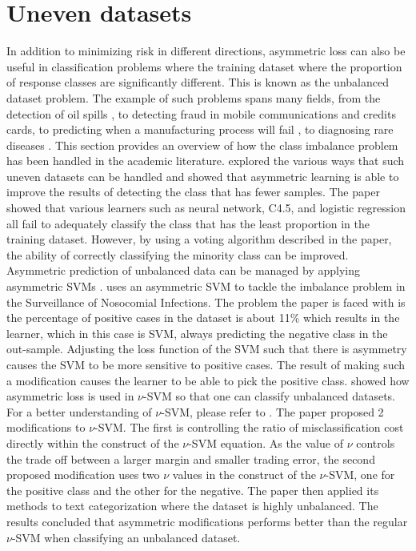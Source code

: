 \section{Uneven datasets}
In addition to minimizing risk in different directions, asymmetric loss can also be useful in classification problems where the training dataset where the proportion of response classes are significantly different. This is known as the unbalanced dataset problem. The example of such problems spans many fields, from the detection of oil spills \citep{Kubat98}, to detecting fraud in mobile communications \citep{Fawcett97} and credits cards, to predicting when a manufacturing process will fail \citep{Riddle94}, to diagnosing rare diseases \citep{Laurikkala01}. This section provides an overview of how the class imbalance problem has been handled in the academic literature. \citet{Daskalaki06} explored the various ways that such uneven datasets can be handled and showed that asymmetric learning is able to improve the results of detecting the class that has fewer samples. The paper showed that various learners such as neural network, C4.5, and logistic regression all fail to adequately classify the class that has the least proportion in the training dataset. However, by using a voting algorithm described in the paper, the ability of correctly classifying the minority class can be improved. Asymmetric prediction of unbalanced data can be managed by applying asymmetric SVMs \citep{Changha05} \citep{Huang05}. \citet{Cohen03} uses an asymmetric SVM to tackle the imbalance problem in the Surveillance of Nosocomial Infections. The problem the paper is faced with is the percentage of positive cases in the dataset is about 11\% which results in the learner, which in this case is SVM, always predicting the negative class in the out-sample. Adjusting the loss function of the SVM such that there is asymmetry causes the SVM to be more sensitive to positive cases. The result of making such a modification causes the learner to be able to pick the positive class. \citet{Wu03} showed how asymmetric loss is used in $\nu$-SVM so that one can classify unbalanced datasets. For a better understanding of $\nu$-SVM, please refer to \citet{Scholkopf00}. The paper proposed 2 modifications to $\nu$-SVM. The first is controlling the ratio of misclassification cost directly within the construct of the $\nu$-SVM equation. As the value of $\nu$ controls the trade off between a larger margin and smaller trading error, the second proposed modification uses two $\nu$ values in the construct of the $\nu$-SVM, one for the positive class and the other for the negative. The paper then applied its methods to text categorization where the dataset is highly unbalanced. The results concluded that asymmetric modifications performs better than the regular $\nu$-SVM when classifying an unbalanced dataset. 

